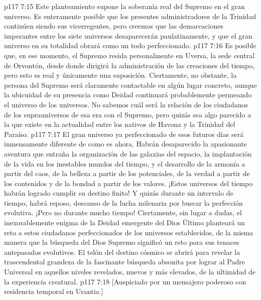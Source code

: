 \vs p117 7:15 Este planteamiento supone la soberanía real del Supremo en el gran universo. Es enteramente posible que los presentes administradores de la Trinidad continúen siendo sus vicerregentes, pero creemos que las demarcaciones imperantes entre los siete universos desaparecerán paulatinamente, y que el gran universo en su totalidad obrará como un todo perfeccionado.
\vs p117 7:16 Es posible que, en ese momento, el Supremo resida personalmente en Uversa, la sede central de Orvontón, desde donde dirigirá la administración de las creaciones del tiempo, pero esto es real y únicamente una suposición. Ciertamente, no obstante, la persona del Supremo será claramente contactable en algún lugar concreto, aunque la ubicuidad de su presencia como Deidad continuará probablemente permeando el universo de los universos. No sabemos cuál será la relación de los ciudadanos de los suprauniversos de esa era con el Supremo, pero quizás sea algo parecido a la que existe en la actualidad entre los nativos de Havona y la Trinidad del Paraíso.
\vs p117 7:17 \pc El gran universo ya perfeccionado de esos futuros días será inmensamente diferente de como es ahora. Habrán desaparecido la apasionante aventura que entraña la organización de las galaxias del espacio, la implantación de la vida en los inestables mundos del tiempo, y el desarrollo de la armonía a partir del caos, de la belleza a partir de los potenciales, de la verdad a partir de los contenidos y de la bondad a partir de los valores. ¡Estos universos del tiempo habrán logrado cumplir su destino finito! Y quizás durante un intervalo de tiempo, habrá reposo, descanso de la lucha milenaria por buscar la perfección evolutiva. ¡Pero no durante mucho tiempo! Ciertamente, sin lugar a dudas, el inexorablemente enigma de la Deidad emergente del Dios Último planteará un reto a estos ciudadanos perfeccionados de los universos establecidos, de la misma manera que la búsqueda del Dios Supremo significó un reto para sus tenaces antepasados evolutivos. El telón del destino cósmico se abrirá para revelar la trascendental grandeza de la fascinante búsqueda absonita por lograr al Padre Universal en aquellos niveles revelados, nuevos y más elevados, de la ultimidad de la experiencia creatural.
\vsetoff
\vs p117 7:18 [Auspiciado por un mensajero poderoso con residencia temporal en Urantia.]

